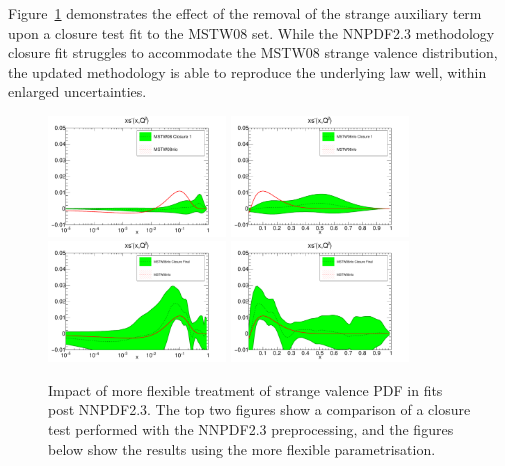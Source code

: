 Figure~\ref{fig:preproc5} demonstrates the effect of the removal of the strange auxiliary term upon a closure test fit to the MSTW08 set. While the NNPDF2.3 methodology closure fit struggles to accommodate the MSTW08 strange valence distribution, the updated methodology is able to reproduce the underlying law well, within enlarged uncertainties.

\begin{figure}[h!]
\centering
\includegraphics[width=0.42\textwidth]{7-PostLHC/figs/Preproc1/pdf_xsminus_log_others.pdf}
\includegraphics[width=0.42\textwidth]{7-PostLHC/figs/Preproc1/pdf_xsminus_others.pdf}
\includegraphics[width=0.42\textwidth]{7-PostLHC/figs/PreprocFixed/pdf_xsminus_log_others.pdf}
\includegraphics[width=0.42\textwidth]{7-PostLHC/figs/PreprocFixed/pdf_xsminus_others.pdf}
\caption[Impact of more flexible treatment of strange valence PDF in fits post NNPDF2.3]{Impact of more flexible treatment of strange valence PDF in fits post NNPDF2.3. The top two figures show a comparison of a closure test performed with the NNPDF2.3 preprocessing, and the figures below show the results using the more flexible parametrisation.}
\label{fig:preproc5}
\end{figure}

